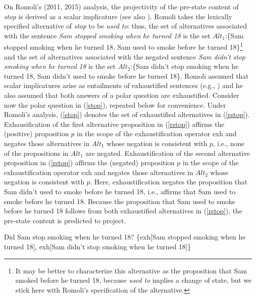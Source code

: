 \documentclass[a4paper,12pt]{article}
\newcommand{\6}{\mbox{$[\hspace*{-.6mm}[$}}
\newcommand{\9}{\mbox{$]\hspace*{-.6mm}]$}}
\begin{document}
On Romoli's (2011, 2015) analysis, the projectivity of the pre-state content of {\em stop} is derived as a scalar implicature (see also \citealt{chemla09}). Romoli takes the lexically specified alternative of {\em stop} to be {\em used to}: thus, the set of alternatives associated with the sentence {\em Sam stopped smoking when he turned 18} is the set $Alt_1$:\{Sam stopped smoking when he turned 18, Sam used to smoke before he turned 18\}\footnote{It may be better to characterize this alternative as the proposition that Sam smoked before he turned 18, because {\em used to} implies a change of state, but we stick here with Romoli's specification of the alternative.} and the set of alternatives associated with the negated sentence {\em Sam didn't stop smoking when he turned 18} is the set $Alt_2$:\{Sam didn't stop smoking when he turned 18, Sam didn't used to smoke before he turned 18\}. Romoli assumed that scalar implicatures arise as entailments of exhaustified sentences (e.g., \citealt{chierchia-etal2012}) and he also assumed that both answers of a polar question are exhaustified. Consider now the polar question in (\ref{stop}), repeated below for convenience. Under Romoli's analysis, (\ref{stop}) denotes the set of exhaustified alternatives in (\ref{rstop}). Exhausification of the first alternative proposition in (\ref{rstop}) affirms the (positive) proposition $p$ in the scope of the exhaustification operator {\sc exh} and negates those alternatives in $Alt_1$ whose negation is consistent with $p$, i.e., none of the propositions in $Alt_1$ are negated. Exhaustification of the second alternative proposition in (\ref{rstop}) affirms the (negated) proposition $p$ in the scope of the exhaustification operator {\sc exh} and negates those alternatives in $Alt_2$ whose negation is consistent with $p$. Here, exhaustification negates the proposition that Sam didn't used to smoke before he turned 18, i.e., affirms that Sam used to smoke before he turned 18. Because the proposition that Sam used to smoke before he turned 18 follows from both exhaustified alternatives in (\ref{rstop}), the pre-state content is predicted to project.

\begin{exe}
\exi{(\ref{stop})} Did Sam stop smoking when he turned 18?
\ex\label{rstop} \{{\sc exh}[Sam stopped smoking when he turned 18], {\sc exh}[Sam didn't stop smoking when he turned 18]\}
\end{exe}
\end{document}
